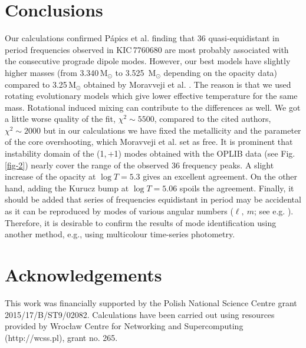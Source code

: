 \documentclass[epj,twocolumn]{webofc}
\begin{document}
\section{Conclusions}
\label{sec-con}
Our calculations confirmed P{\'a}pics et al. \citep{Papics2015} finding that 36
quasi-equidistant in period frequencies observed in KIC\,7760680 are most probably associated with the consecutive
prograde dipole modes. However, our best models have slightly higher masses
(from 3.340$\,\mathrm{M_\odot}$ to 3.525 $\,\mathrm{M_\odot}$ depending on the opacity data)
compared to 3.25$\,\mathrm{M_\odot}$ obtained by Moravveji et al. \citep{Moravveji2016}. The reason is that
we used rotating evolutionary models which give lower effective temperature for the same mass.
Rotational induced mixing can contribute to the differences as well. We got a little worse quality of the fit,
$\chi^{2} \sim 5500$, compared to the cited authors,
$\chi^{2} \sim 2000$ but in our calculations we have fixed the metallicity and the parameter of the core overshooting, which Moravveji et al. \citep{Moravveji2016} set as free.
It is prominent that instability domain of the (1,\,+1) modes obtained with the OPLIB data (see Fig.\,\ref{fig-2})
nearly cover the range of the observed 36 frequency peaks.
A slight increase of the opacity at $\log T=5.3$ gives an excellent agreement.
On the other hand, adding the Kurucz bump at $\log T=5.06$ spoils the agreement.
Finally, it should be added that  series of frequencies equidistant in period may be accidental as
it can be reproduced by modes of various angular numbers ($\ell,~m$; see e.g. \cite{Szewczuk2014}).
Therefore, it is desirable to confirm the results of mode identification
using another method, e.g., using multicolour time-series photometry.





\section*{\footnotesize Acknowledgements}


\footnotesize
This work was financially supported by the Polish National Science Centre grant 2015/17/B/ST9/02082.
Calculations have been carried out using
resources provided by Wroc{\l}aw Centre for Networking and Supercomputing (http://wcss.pl), grant no. 265.\\

% 
%
%
%

%



\end{document}
